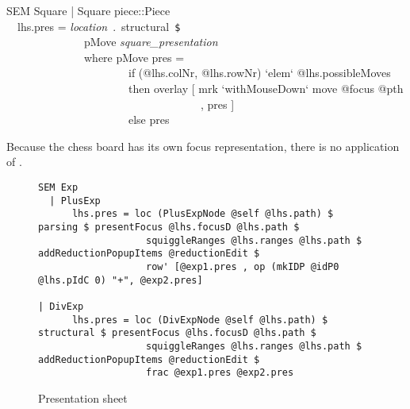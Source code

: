 \ttfamily\begin{small}\begin{tabbing}
SEM Square | Square piece::Piece\\
~~lhs.pres = {\em location}~.~structural~\verb|$|\\
~~~~~~~~~~~~~~pMove {\em square\_presentation}\\
~~~~~~~~~~~~~~where pMove pres =\\
~~~~~~~~~~~~~~~~~~~~~~if (@lhs.colNr, @lhs.rowNr) `elem` @lhs.possibleMoves\\
~~~~~~~~~~~~~~~~~~~~~~then overlay [ mrk `withMouseDown` move @focus @pth\\
~~~~~~~~~~~~~~~~~~~~~~~~~~~~~~~~~~~, pres ]\\
~~~~~~~~~~~~~~~~~~~~~~else pres\\
\end{tabbing}\end{small}\rmfamily

Because the chess board has its own focus representation, there is no application of .



\bc
\begin{figure}
\begin{small}
\begin{center}
\begin{footnotesize}
\begin{verbatim}
SEM Exp
  | PlusExp
      lhs.pres = loc (PlusExpNode @self @lhs.path) $ parsing $ presentFocus @lhs.focusD @lhs.path $
                   squiggleRanges @lhs.ranges @lhs.path $ addReductionPopupItems @reductionEdit $
                   row' [@exp1.pres , op (mkIDP @idP0 @lhs.pIdC 0) "+", @exp2.pres]

| DivExp      
      lhs.pres = loc (DivExpNode @self @lhs.path) $ structural $ presentFocus @lhs.focusD @lhs.path $
                   squiggleRanges @lhs.ranges @lhs.path $ addReductionPopupItems @reductionEdit $
                   frac @exp1.pres @exp2.pres
\end{verbatim}
\end{footnotesize}
\caption{Presentation sheet}\label{presSheetExample} 
\end{center}
\end{small}
\end{figure}
\ec

